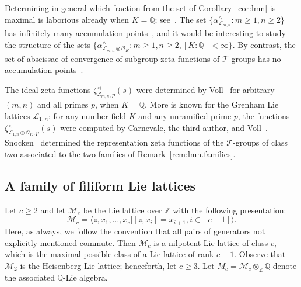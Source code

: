 \documentclass[11pt,a4paper]{amsart}
\theoremstyle{plain}
\theoremstyle{remark}
\newcommand{\Z}{\mathbb{Z}}
\newcommand{\Q}{\mathbb{Q}}
\newcommand{\tensor}{\otimes}
\begin{document}
Determining in general which fraction from the set of Corollary~\ref{cor:lmn} is maximal is laborious already when $K = \Q$; see~\cite[\S5]{BKO/Dstar}.  The set $\{ \alpha^\wedge_{\mathcal{L}_{m,n}} : m \geq 1, n \geq 2 \}$ has infinitely many accumulation points~\cite[Corollary~1.8]{BKO/Dstar}, and it would be interesting to study the structure of the sets $\{ \alpha^\wedge_{\mathcal{L}_{m,n} \tensor \mathcal{O}_K} : m \geq 1, n \geq 2, [K:\Q] < \infty \}$.  By contrast, the set of abscissae of convergence of subgroup zeta functions of $\mathcal{T}$-groups has no accumulation points~\cite[Proposition~1.1]{duSG/06}.

The ideal zeta functions $\zeta^\vartriangleleft_{\mathcal{L}_{m,n},p}(s)$ were determined by Voll~\cite[Theorem~1.1]{Voll/19} for arbitrary $(m,n)$ and all primes $p$, when $K = \Q$.  More is known for the Grenham Lie lattices $\mathcal{L}_{1,n}$: for any number field $K$ and any unramified prime $p$, the functions $\zeta^\vartriangleleft_{\mathcal{L}_{1,n} \tensor \mathcal{O}_K, p}(s)$ were computed by Carnevale, the third author, and Voll~\cite[Proposition~5.8]{CSV/19}.  Snocken~\cite[Theorem~5.11 and Example~6.2]{Snocken/12} determined the representation zeta functions of the $\mathcal{T}$-groups of class two associated to the two families of Remark~\ref{rem:lmn.families}.

\subsection{A family of filiform Lie lattices} \label{sec:max.class}
Let $c \geq 2$ and let $\mathcal{M}_c$ be the Lie lattice over $\Z$ with the following presentation:
\begin{equation} \label{equ:max.class.present}
\mathcal{M}_c = \langle z, x_1, \dots, x_c | [z, x_i] = x_{i+1}, i \in [c-1] \rangle.
\end{equation}
Here, as always, we follow the convention that all pairs of generators not explicitly mentioned commute.  Then $\mathcal{M}_c$ is a nilpotent Lie lattice of class $c$, which is the maximal possible  class of a Lie lattice of rank $c + 1$.  Observe that $\mathcal{M}_2$ is the Heisenberg Lie lattice; henceforth, let $c \geq 3$.  Let $M_c = \mathcal{M}_c \tensor_\Z \Q$ denote the associated $\Q$-Lie algebra.  
\end{document}
